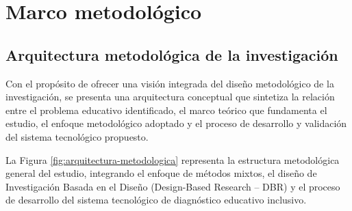 \chapter{Marco metodológico}

\begin{refsection}

\section{Arquitectura metodológica de la investigación}

Con el propósito de ofrecer una visión integrada del diseño metodológico de la investigación, se presenta una arquitectura conceptual que sintetiza la relación entre el problema educativo identificado, el marco teórico que fundamenta el estudio, el enfoque metodológico adoptado y el proceso de desarrollo y validación del sistema tecnológico propuesto.

La Figura \ref{fig:arquitectura-metodologica} representa la estructura metodológica general del estudio, integrando el enfoque de métodos mixtos, el diseño de Investigación Basada en el Diseño (Design-Based Research -- DBR) y el proceso de desarrollo del sistema tecnológico de diagnóstico educativo inclusivo.

\begin{figure}[htbp]
\centering
{}
\end{figure}
\end{refsection}
